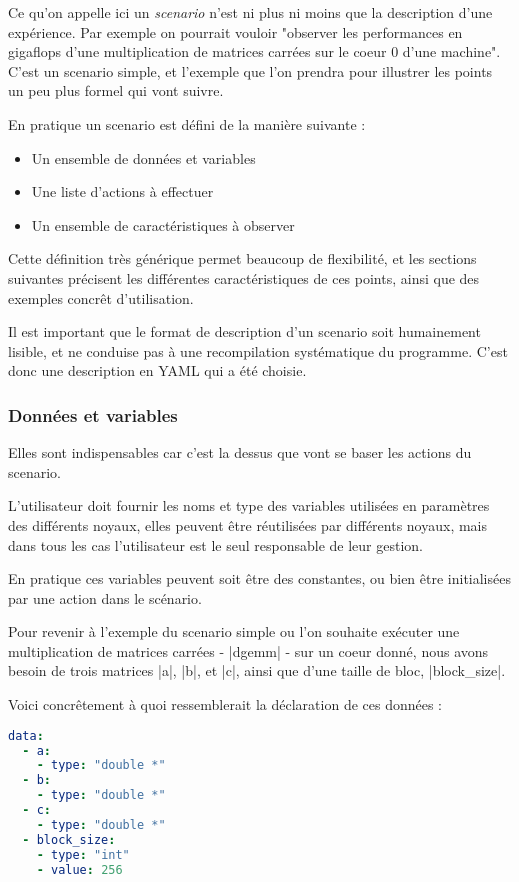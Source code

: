 Ce qu'on appelle ici un \emph{scenario} n'est ni plus ni moins que la description d'une expérience.
Par exemple on pourrait vouloir "observer les performances en gigaflops d'une multiplication de matrices carrées sur le coeur 0 d'une machine".
C'est un scenario simple, et l'exemple que l'on prendra pour illustrer les points un peu plus formel qui vont suivre.

En pratique un scenario est défini de la manière suivante :
\begin{itemize}
 \item Un ensemble de données et variables
 \item Une liste d'actions à effectuer
 \item Un ensemble de caractéristiques à observer
\end{itemize}

Cette définition très générique permet beaucoup de flexibilité, et les sections suivantes précisent les différentes caractéristiques de ces points, ainsi que des exemples concrêt d'utilisation.

Il est important que le format de description d'un scenario soit humainement lisible, et ne conduise pas à une recompilation systématique du programme. C'est donc une description en YAML qui a été choisie.

\subsubsection{Données et variables}

Elles sont indispensables car c'est la dessus que vont se baser les actions du scenario.

L'utilisateur doit fournir les noms et type des variables utilisées en paramètres des différents noyaux, elles peuvent être réutilisées par différents noyaux, mais dans tous les cas l'utilisateur est le seul responsable de leur gestion.

En pratique ces variables peuvent soit être des constantes, ou bien être initialisées par une action dans le scénario.

Pour revenir à l'exemple du scenario simple ou l'on souhaite exécuter une multiplication de matrices carrées - |dgemm| - sur un coeur donné, nous avons besoin de trois matrices |a|, |b|, et |c|, ainsi que d'une taille de bloc, |block_size|.

Voici concrêtement à quoi ressemblerait la déclaration de ces données :

\begin{lstlisting}[language=yaml,caption=Exemple de déclaration de variables,label=lst:tool:data-example]
data:
  - a:
    - type: "double *"
  - b:
    - type: "double *"
  - c:
    - type: "double *"
  - block_size:
    - type: "int"
    - value: 256
\end{lstlisting}

